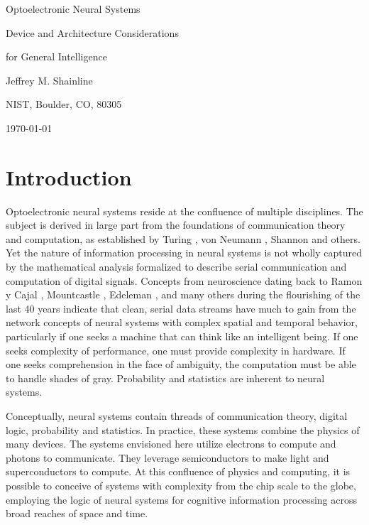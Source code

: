 \documentclass[twocolumn]{article}
\begin{document}
	
	\centerline{\LARGE Optoelectronic Neural Systems}
	\vspace{0.5em}
	\centerline{\Large Device and Architecture Considerations}
	\vspace{0.25em}
	\centerline{\Large for General Intelligence}
	\vspace{0.75em}
	\centerline{\large Jeffrey M. Shainline}
	\vspace{0.5em}
	\centerline{\normalsize NIST, Boulder, CO, 80305}
	\vspace{0.5em}
	\centerline{\small \today}
	
\begin{abstract}

\end{abstract}

\tableofcontents

\section{\label{sec:introduction}Introduction}
Optoelectronic neural systems reside at the confluence of multiple disciplines. The subject is derived in large part from the foundations of communication theory and computation, as established by Turing \cite{tu1936}, von Neumann \cite{ne1945}, Shannon \cite{sh1948} and others. Yet the nature of information processing in neural systems is not wholly captured by the mathematical analysis formalized to describe serial communication and computation of digital signals. Concepts from neuroscience dating back to Ramon y Cajal \cite{}, Mountcastle \cite{}, Edeleman \cite{}, and many others during the flourishing of the last 40 years indicate that clean, serial data streams have much to gain from the network concepts of neural systems with complex spatial and temporal behavior, particularly if one seeks a machine that can think like an intelligent being. If one seeks complexity of performance, one must provide complexity in hardware. If one seeks comprehension in the face of ambiguity, the computation must be able to handle shades of gray. Probability and statistics are inherent to neural systems. 

Conceptually, neural systems contain threads of communication theory, digital logic, probability and statistics. In practice, these systems combine the physics of many devices. The systems envisioned here utilize electrons to compute and photons to communicate. They leverage semiconductors to make light and superconductors to compute. At this confluence of physics and computing, it is possible to conceive of systems with complexity from the chip scale to the globe, employing the logic of neural systems for cognitive information processing across broad reaches of space and time. 
\end{document}
